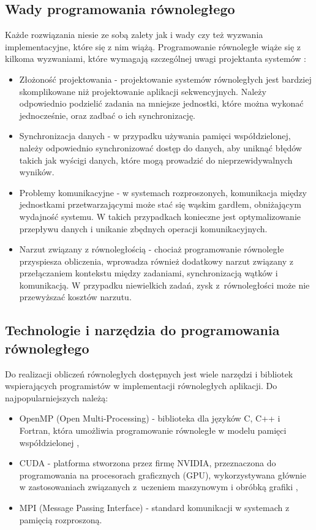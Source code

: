 \subsection{Wady programowania równoległego}
Każde rozwiązania niesie ze sobą zalety jak i wady czy też wyzwania implementacyjne, które się z nim wiążą. Programowanie równoległe wiąże się z kilkoma wyzwaniami, które wymagają szczególnej uwagi projektanta systemów \cite{ParallelProgramming, CUDA}:
\begin{itemize}
    \item Złożoność projektowania - projektowanie systemów równoległych jest bardziej skomplikowane niż projektowanie aplikacji sekwencyjnych. Należy odpowiednio podzielić zadania na mniejsze jednostki, które można wykonać jednocześnie, oraz zadbać o ich synchronizację.
    \item Synchronizacja danych - w przypadku używania pamięci współdzielonej, należy odpowiednio synchronizować dostęp do danych, aby uniknąć błędów takich jak wyścigi danych, które mogą prowadzić do nieprzewidywalnych wyników.
    \item Problemy komunikacyjne - w systemach rozproszonych, komunikacja między jednostkami przetwarzającymi może stać się wąskim gardłem, obniżającym wydajność systemu. W takich przypadkach konieczne jest optymalizowanie przepływu danych i unikanie zbędnych operacji komunikacyjnych.
    \item Narzut związany z równoległością - chociaż programowanie równoległe przyspiesza obliczenia, wprowadza również dodatkowy narzut związany z przełączaniem kontekstu między zadaniami, synchronizacją wątków i komunikacją. W przypadku niewielkich zadań, zysk z~równoległości może nie przewyższać kosztów narzutu.
\end{itemize}


\subsection{Technologie i narzędzia do programowania równoległego}
Do realizacji obliczeń równoległych dostępnych jest wiele narzędzi i bibliotek wspierających programistów w implementacji równoległych aplikacji. Do najpopularniejszych należą:
\begin{itemize}
    \item OpenMP (Open Multi-Processing) - biblioteka dla języków C, C++ i Fortran, która umożliwia programowanie równoległe w modelu pamięci współdzielonej \cite{ParallelProgramminginC++withOpenMP, ProgramminInOpenMp},
    \item CUDA - platforma stworzona przez firmę NVIDIA, przeznaczona do programowania na procesorach graficznych (GPU), wykorzystywana głównie w zastosowaniach związanych z~uczeniem maszynowym i obróbką grafiki \cite{CUDA},
    \item MPI (Message Passing Interface) - standard komunikacji w systemach z pamięcią rozproszoną.
\end{itemize}




